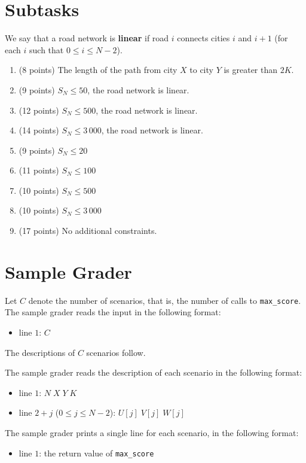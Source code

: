 \section*{Subtasks}

We say that a road network is \textbf{linear} if road $i$ connects
cities $i$ and $i + 1$ (for each $i$ such that
$0 \le i \le N - 2$).

\begin{enumerate}
\def\labelenumi{\arabic{enumi}.}
\item
  (8 points) The length of the path from city $X$ to city $Y$ is
  greater than $2K$.
\item
  (9 points) $S_N \le 50$, the road network is linear.
\item
  (12 points) $S_N \le 500$, the road network is linear.
\item
  (14 points) $S_N \le 3\,000$, the road network is linear.
\item
  (9 points) $S_N \le 20$
\item
  (11 points) $S_N \le 100$
\item
  (10 points) $S_N \le 500$
\item
  (10 points) $S_N \le 3\,000$
\item
  (17 points) No additional constraints.
\end{enumerate}

\section*{Sample Grader}

Let $C$ denote the number of scenarios, that is, the number of calls
to \texttt{max\_score}. The sample grader reads the input in the
following format:

\begin{itemize}
  \item line $1$: $C$
\end{itemize}

The descriptions of $C$ scenarios follow.

The sample grader reads the description of each scenario in the
following format:

\begin{itemize}
  \item line $1$: $N \; X \; Y \; K$
  \item line $2 + j$ ($0 \le j \le N - 2$): $U[j] \; V[j] \; W[j]$
\end{itemize}

The sample grader prints a single line for each scenario, in the
following format:

\begin{itemize}
  \item line $1$: the return value of \texttt{max\_score}
\end{itemize}

